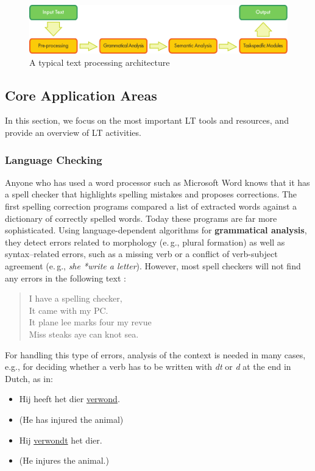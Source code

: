 \documentclass[]{../../metanetpaper}
\begin{document}
\begin{multicols}{2}
\begin{figure}[htb]
  \center
  \includegraphics[width=\textwidth]{../_media/english/text_processing_app_architecture}
  \caption{A typical text processing architecture}
  \label{fig:textprocessingarch_en}
\end{figure}

\subsection{Core Application Areas}

In this section, we focus on the most important LT tools and resources, and provide an overview of LT activities.

\subsubsection{Language Checking}

Anyone who has used a word processor such as Microsoft Word knows that it has a spell checker that highlights spelling mistakes and proposes corrections. The first spelling correction programs compared a list of extracted words against a dictionary of correctly spelled words. Today these programs are far more sophisticated. Using language-dependent algorithms for \textbf{grammatical analysis}, they detect errors related to morphology (e.\,g., plural formation) as well as syntax–related errors, such as a missing verb or a conflict of verb-subject agreement (e.\,g., \textit{she *write a letter}). However, most spell checkers will not find any errors in the following text \cite{zar1}:

\begin{quote}
  I have a spelling checker,\\
  It came with my PC.\\
  It plane lee marks four my revue\\
  Miss steaks aye can knot sea.
\end{quote}

    For handling this type of errors, analysis of the context is needed in many cases, e.g., for deciding whether a verb has to be written with \textit{dt} or \textit{d} at the end in Dutch, as in:\\
\begin{itemize}
  \item  Hij heeft het dier \underline{verwond}.
 \item   (He has injured the animal)
 \item   Hij \underline{verwondt} het dier.
  \item  (He injures the animal.)
\end{itemize}



\end{multicols}
\end{document}
